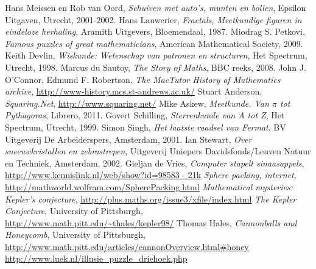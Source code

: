 
\begin{thebibliography}{17}
\label{1} Hans Meissen en Rob van Oord, \textit{Schuiven met auto's, munten en bollen}, Epsilon Uitgaven, Utrecht, 2001-2002.
\label{2} Hans Lauwerier, \textit{Fractals, Meetkundige figuren in eindeloze herhaling}, Aramith Uitgevers, Bloemendaal, 1987.
\label{3} Miodrag S. Petkovi, \textit{Famous puzzles of great mathematicians}, American Mathematical Society, 2009.
\label{4} Keith Devlin, \textit{Wiskunde: Wetenschap van patronen en structuren}, Het Spectrum, Utrecht, 1998.
\label{5} Marcus du Sautoy, \textit{The Story of Maths}, BBC reeks, 2008.
\label{6} John J. O'Connor, Edmund F. Robertson, \textit{The MacTutor History of Mathematics archive}, \url{http://www-history.mcs.st-andrews.ac.uk/}
\label{7} Stuart Anderson, \textit{Squaring.Net}, \url{http://www.squaring.net/}
\label{8} Mike Askew, \textit{Meetkunde. Van $\pi$ tot Pythagoras}, Librero, 2011.
\label{9} Govert Schilling, \textit{Sterrenkunde van A tot Z}, Het Spectrum, Utrecht, 1999.
\label{10} Simon Singh, \textit{Het laatste raadsel van Fermat}, BV Uitgeverij De Arbeiderspers, Amsterdam, 2001.
\label{11} Ian Stewart, \textit{Over sneeuwkristallen en zebrastrepen}, Uitgeverij Uniepers Davidsfonds/Leuven Natuur en Techniek, Amsterdam, 2002.
\label{12} Gieljan de Vries, \textit{Computer stapelt sinaasappels}, \url{http://www.kennislink.nl/web/show?id=98583 - 21k}
\label{13} \textit{Sphere packing, internet}, \url{http://mathworld.wolfram.com/SpherePacking.html}
\label{14} \textit{Mathematical mysteries: Kepler's conjecture}, \url{http://plus.maths.org/issue3/xfile/index.html}
\label{15} \textit{The Kepler Conjecture}, University of Pittsburgh, \url{http://www.math.pitt.edu/~thales/kepler98/}
\label{16} Thomas Hales, \textit{Cannonballs and Honeycomb}, University of Pittsburgh, \url{http://www.math.pitt.edu/articles/cannonOverview.html#honey}
\label{17} \url{http://www.luek.nl/illusie\_puzzle\_driehoek.php}
\end{thebibliography}
